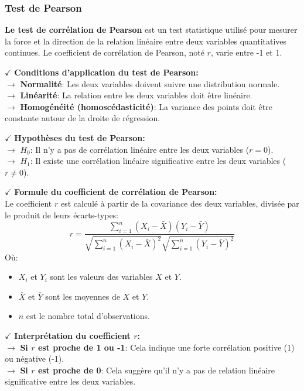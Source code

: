 \subsubsection{Test de Pearson}

\textbf{Le test de corrélation de Pearson} est un test statistique utilisé pour mesurer la force et la direction de la relation linéaire entre deux variables quantitatives continues. Le coefficient de corrélation de Pearson, noté \( r \), varie entre -1 et 1.

\textbf{\(\checkmark\)} \textbf{Conditions d'application du test de Pearson:}\\
    \textbf{\(\rightarrow\)} \textbf{Normalité}: Les deux variables doivent suivre une distribution normale.\\
    \textbf{\(\rightarrow\)} \textbf{Linéarité}: La relation entre les deux variables doit être linéaire.\\
    \textbf{\(\rightarrow\)} \textbf{Homogénéité (homoscédasticité)}: La variance des points doit être constante autour de la droite de régression.

\textbf{\(\checkmark\)} \textbf{Hypothèses du test de Pearson:}\\
    \textbf{\(\rightarrow\)} \( H_0 \): Il n’y a pas de corrélation linéaire entre les deux variables (\( r = 0 \)).\\
    \textbf{\(\rightarrow\)} \( H_1 \): Il existe une corrélation linéaire significative entre les deux variables (\( r \neq 0 \)).

\textbf{\(\checkmark\)} \textbf{Formule du coefficient de corrélation de Pearson:}\\
Le coefficient \( r \) est calculé à partir de la covariance des deux variables, divisée par le produit de leurs écarts-types:
\[
r = \frac{\sum_{i=1}^{n} (X_i - \bar{X})(Y_i - \bar{Y})}{\sqrt{\sum_{i=1}^{n} (X_i - \bar{X})^2} \sqrt{\sum_{i=1}^{n} (Y_i - \bar{Y})^2}}
\]
Où:
\begin{itemize}
    \item \( X_i \) et \( Y_i \) sont les valeurs des variables \( X \) et \( Y \).
    \item \( \bar{X} \) et \( \bar{Y} \) sont les moyennes de \( X \) et \( Y \).
    \item \( n \) est le nombre total d'observations.
\end{itemize}

\textbf{\(\checkmark\)} \textbf{Interprétation du coefficient \( r \):}\\
    \textbf{\(\rightarrow\)} \textbf{Si \( r \) est proche de 1 ou -1}: Cela indique une forte corrélation positive (1) ou négative (-1).\\
    \textbf{\(\rightarrow\)} \textbf{Si \( r \) est proche de 0}: Cela suggère qu’il n’y a pas de relation linéaire significative entre les deux variables.

